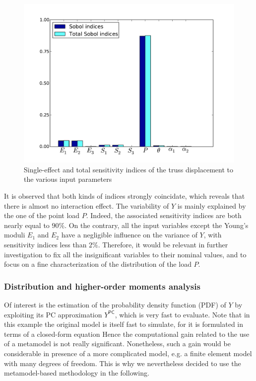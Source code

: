 \documentclass[11pt]{article}
\begin{document}
\begin{figure}[Hhbtp] 
  \begin{center}
    \includegraphics[width=12cm]{Truss_SA.pdf}
  \end{center} 
  \caption{Single-effect and total sensitivity indices of the truss displacement to the various input parameters}
\label{fig_SA}
\end{figure}

It is observed that both kinds of indices strongly coincidate, which reveals that there is almost no interaction effect. The variability of $Y$ is mainly explained by the one of the point load $P$. Indeed, the associated sensitivity indices are both nearly equal to $90\%$. On the contrary, all the input variables except the Young's moduli $E_1$ and $E_2$ have a negligible influence on the variance of $Y$, with sensitivity indices less than $2\%$. Therefore, it would be relevant in further investigation to fix all the insignificant variables to their nominal values, and to focus on a fine characterization of the distribution of the load $P$. 

\subsubsection{Distribution and higher-order moments analysis}

Of interest is the estimation of the probability density function (PDF) of $Y$ by exploiting its PC approximation $Y^\textsf{PC}$, which is very fast to evaluate. Note that in this example the original model is itself fast to simulate, for it is formulated in terms of a closed-form equation Hence the computational gain related to the use of a metamodel is not really significant. Nonetheless, such a gain would be considerable in presence of a more complicated model, e.g. a finite element model with many degrees of freedom. This is why we nevertheless decided to use the metamodel-based methodology in the following. \\
\end{document}
